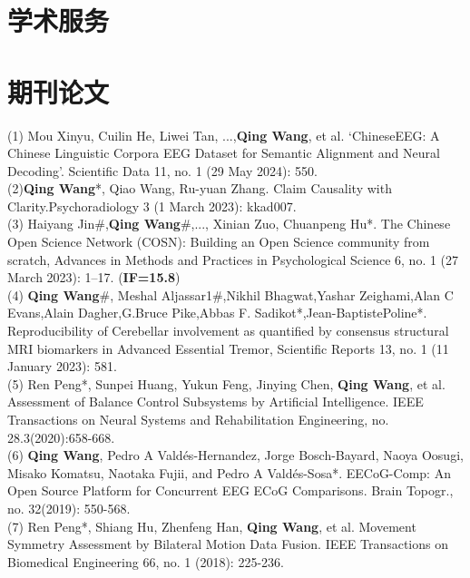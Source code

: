 \documentclass{resume}
\begin{document}
\section{学术服务}

\section{期刊论文}
(1) Mou Xinyu, Cuilin He, Liwei Tan, ...,\textbf{Qing Wang}, et al. ‘ChineseEEG: A Chinese Linguistic Corpora EEG Dataset for Semantic Alignment and Neural Decoding’. Scientific Data 11, no. 1 (29 May 2024): 550. \\
(2)\textbf{Qing Wang}*, Qiao Wang, Ru-yuan Zhang. Claim Causality with Clarity.Psychoradiology 3 (1 March 2023): kkad007. \\
(3) Haiyang Jin\#,\textbf{Qing Wang}\#,..., Xinian Zuo, Chuanpeng Hu*. The Chinese Open Science Network (COSN): Building an Open Science community from scratch, Advances in Methods and Practices in Psychological Science 6, no. 1 (27 March 2023): 1–17. (\textbf{IF=15.8})\\
(4) \textbf{Qing Wang}\#, Meshal Aljassar1\#,Nikhil Bhagwat,Yashar Zeighami,Alan C Evans,Alain Dagher,G.Bruce Pike,Abbas F. Sadikot*,Jean-BaptistePoline*. Reproducibility of Cerebellar involvement as quantified by consensus structural MRI biomarkers in Advanced Essential Tremor, Scientific Reports 13, no. 1 (11 January 2023): 581.\\
(5) Ren Peng*, Sunpei Huang, Yukun Feng, Jinying Chen, \textbf{Qing Wang}, et al. Assessment of Balance Control Subsystems by Artificial Intelligence. IEEE Transactions on Neural Systems and Rehabilitation Engineering, no. 28.3(2020):658-668.\\
(6) \textbf{Qing Wang}, Pedro A Vald{\'e}s-Hernandez, Jorge Bosch-Bayard, Naoya Oosugi, Misako Komatsu, Naotaka Fujii, and Pedro A Vald{\'e}s-Sosa*. EECoG-Comp: An Open Source Platform for Concurrent EEG ECoG Comparisons. Brain Topogr., no. 32(2019): 550-568.\\
(7) Ren Peng*, Shiang Hu, Zhenfeng Han, \textbf{Qing Wang}, et al. Movement Symmetry Assessment by Bilateral Motion Data Fusion. IEEE Transactions on Biomedical Engineering 66, no. 1 (2018): 225-236.\\
\end{document}
